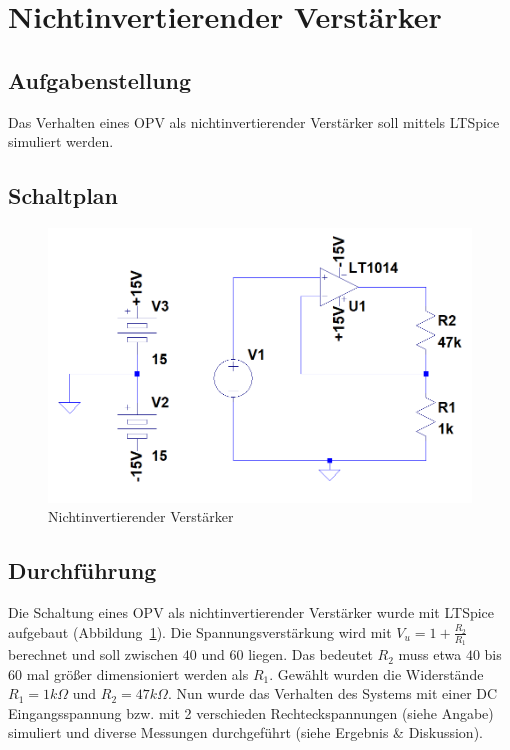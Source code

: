 \documentclass[12pt,a4paper,titlepage]{article}
\begin{document}
\setcounter{page}{2}

\newpage
\setcounter{tocdepth}{1}
\tableofcontents

\newpage



\section{Nichtinvertierender Verst\"arker}

\subsection{Aufgabenstellung}
Das Verhalten eines OPV als nichtinvertierender Verst\"arker soll mittels LTSpice simuliert werden.

\subsection{Schaltplan}
\begin{figure}[H]
  \centering
  \includegraphics{nichtinvertierend_schaltung}
  \caption{Nichtinvertierender Verst\"arker}
  \label{figure01}
\end{figure}

\subsection{Durchf\"uhrung}
Die Schaltung eines OPV als nichtinvertierender Verst\"arker wurde mit LTSpice aufgebaut (Abbildung~\ref{figure01}). Die Spannungsverst\"arkung wird mit $V_u = 1 + \frac{R_2}{R_1}$ berechnet und soll zwischen $40$ und $60$ liegen. Das bedeutet $R_2$ muss etwa $40$ bis $60$ mal gr\"o\ss er dimensioniert werden als $R_1$. Gew\"ahlt wurden die Widerst\"ande $R_1 = 1k\Omega$ und $R_2 = 47k\Omega$. Nun wurde das Verhalten des Systems mit einer DC Eingangsspannung bzw. mit 2 verschieden Rechteckspannungen (siehe Angabe) simuliert und diverse Messungen durchgef\"uhrt (siehe Ergebnis \& Diskussion).
\end{document}
